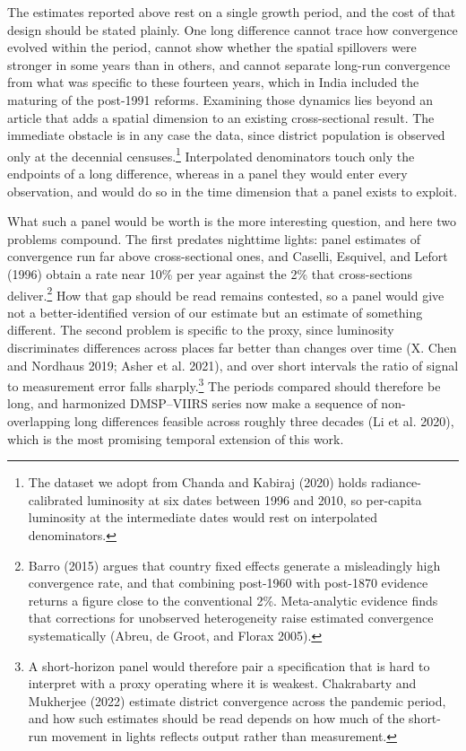 \documentclass[
  letterpaper,
  DIV=11,
  numbers=noendperiod]{scrartcl}
\begin{document}
The estimates reported above rest on a single growth period, and the
cost of that design should be stated plainly. One long difference cannot
trace how convergence evolved within the period, cannot show whether the
spatial spillovers were stronger in some years than in others, and
cannot separate long-run convergence from what was specific to these
fourteen years, which in India included the maturing of the post-1991
reforms. Examining those dynamics lies beyond an article that adds a
spatial dimension to an existing cross-sectional result. The immediate
obstacle is in any case the data, since district population is observed
only at the decennial censuses.\footnote{The dataset we adopt from
  Chanda and Kabiraj (2020) holds radiance-calibrated luminosity at six
  dates between 1996 and 2010, so per-capita luminosity at the
  intermediate dates would rest on interpolated denominators.}
Interpolated denominators touch only the endpoints of a long difference,
whereas in a panel they would enter every observation, and would do so
in the time dimension that a panel exists to exploit.

What such a panel would be worth is the more interesting question, and
here two problems compound. The first predates nighttime lights: panel
estimates of convergence run far above cross-sectional ones, and
Caselli, Esquivel, and Lefort (1996) obtain a rate near 10\% per year
against the 2\% that cross-sections deliver.\footnote{Barro (2015)
  argues that country fixed effects generate a misleadingly high
  convergence rate, and that combining post-1960 with post-1870 evidence
  returns a figure close to the conventional 2\%. Meta-analytic evidence
  finds that corrections for unobserved heterogeneity raise estimated
  convergence systematically (Abreu, de Groot, and Florax 2005).} How
that gap should be read remains contested, so a panel would give not a
better-identified version of our estimate but an estimate of something
different. The second problem is specific to the proxy, since luminosity
discriminates differences across places far better than changes over
time (X. Chen and Nordhaus 2019; Asher et al. 2021), and over short
intervals the ratio of signal to measurement error falls
sharply.\footnote{A short-horizon panel would therefore pair a
  specification that is hard to interpret with a proxy operating where
  it is weakest. Chakrabarty and Mukherjee (2022) estimate district
  convergence across the pandemic period, and how such estimates should
  be read depends on how much of the short-run movement in lights
  reflects output rather than measurement.} The periods compared should
therefore be long, and harmonized DMSP--VIIRS series now make a sequence
of non-overlapping long differences feasible across roughly three
decades (Li et al. 2020), which is the most promising temporal extension
of this work.
\end{document}

